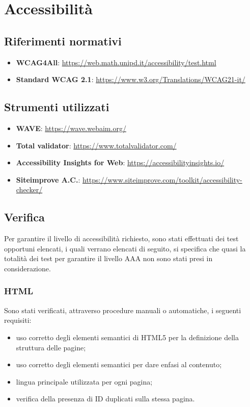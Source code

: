 \section{Accessibilità}
\label{sec:accessibility}

\subsection{Riferimenti normativi}
\label{subsec:accessibility-norms}

\begin{itemize}
    \item \textbf{WCAG4All}: \url{https://web.math.unipd.it/accessibility/test.html}
    \item \textbf{Standard WCAG 2.1}: \url{https://www.w3.org/Translations/WCAG21-it/}
\end{itemize}

\subsection{Strumenti utilizzati}
\begin{itemize}
    \item \textbf{WAVE}: \url{https://wave.webaim.org/}
    \item \textbf{Total validator}: \url{https://www.totalvalidator.com/}
    \item \textbf{Accessibility Insights for Web}: \url{https://accessibilityinsights.io/}
    \item \textbf{Siteimprove A.C.}: \url{https://www.siteimprove.com/toolkit/accessibility-checker/}
\end{itemize}

\subsection{Verifica}
\label{subsec:accessibility-verification}

Per garantire il livello di accessibilità richiesto, sono stati effettuati dei test opportuni elencati, i quali verrano elencati di seguito, si specifica che quasi la totalità dei test per garantire il livello AAA non sono stati presi in considerazione.

\subsubsection{HTML}
\label{subsubsec:accessibility-html}

Sono stati verificati, attraverso procedure manuali o automatiche, i seguenti requisiti:
\begin{itemize}
    \item uso corretto degli elementi semantici di HTML5 per la definizione della struttura delle pagine;
    \item uso corretto degli elementi semantici per dare enfasi al contenuto;
    \item lingua principale utilizzata per ogni pagina;
    \item verifica della presenza di ID duplicati sulla stessa pagina.
\end{itemize}

